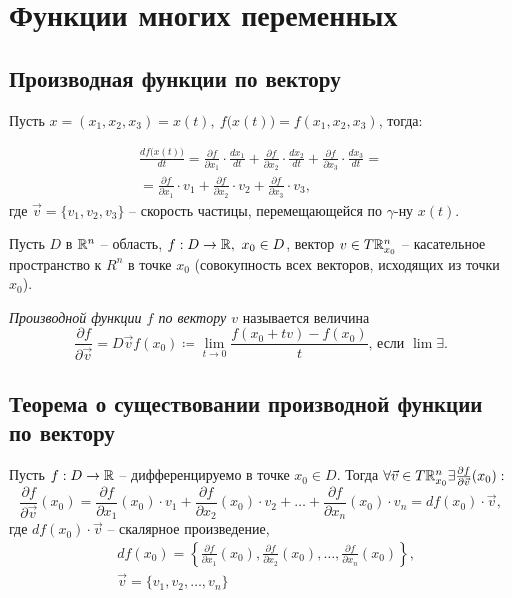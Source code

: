 \section{Функции многих переменных}

\subsection{Производная функции по вектору}

\begin{note}
    Пусть $ x = (x_1,x_2,x_3) = x(t), \ f\big(x(t)\big) = f(x_1,x_2,x_3)$, тогда:

    \begin{multline*}
        \frac{df\big(x(t)\big)}{dt} = \frac{\partial f}{\partial x_1} \cdot \frac{dx_1}{dt} + \frac{\partial f}{\partial x_2} \cdot \frac{dx_2}{dt} + \frac{\partial f}{\partial x_3} \cdot \frac{dx_3}{dt} = \\
        = \frac{\partial f}{\partial x_1} \cdot v_1 + \frac{\partial f}{\partial x_2} \cdot v_2 + \frac{\partial f}{\partial x_3} \cdot v_3,
    \end{multline*}
    где $\vec{v} = \{v_1,v_2,v_3\}$ -- скорость частицы, перемещающейся по $\gamma$-ну $x(t)$.
\end{note}

\begin{definition}
    Пусть $ D $ в $ \mathbb{R}^n $ -- область, $ f:D\rightarrow \mathbb{R}, \ x_0 \in D $, вектор $ v\in T\mathbb{R}_{x_0}^n $ -- касательное пространство к $ R^n $ в точке $ x_0 $ (совокупность всех векторов, исходящих из точки $ x_0 $).

    \emph{Производной функции $ f $ по вектору $ v $} называется величина
    \[
        \frac{\partial f}{\partial \vec{v}} = D \vec{v} f(x_0) \coloneqq \underset{t \rightarrow 0}{\lim}\frac{f(x_0 + tv) - f(x_0)}{t}\text{, если }\lim \exists.
    \]
\end{definition}

\subsection{Теорема о существовании производной функции по вектору}

\begin{statement}
    Пусть $ f:D\rightarrow\mathbb{R} $ -- дифференцируемо в точке $ x_0\in D $. Тогда $ \forall \vec{v}\in T\mathbb{R}_{x_0}^n \exists \frac{\partial f}{\partial \vec{v}}(x_0):$
    \[
        \frac{\partial f}{\partial \vec{v}}(x_0) = \frac{\partial f}{\partial x_1}(x_0) \cdot v_1 + \frac{\partial f}{\partial x_2}(x_0) \cdot v_2 + \ldots +\frac{\partial f}{\partial x_n}(x_0) \cdot v_n = df(x_0)\cdot \vec{v},
    \] где $df(x_0)\cdot \vec{v}$ -- скалярное произведение,
    \begin{align*}
         & df(x_0) = \left\{\frac{\partial f}{\partial x_1}(x_0), \frac{\partial f}{\partial x_2}(x_0), \ldots, \frac{\partial f}{\partial x_n}(x_0)\right\}, \\
         & \vec{v} = \{v_1,v_2,\ldots,v_n\}
    \end{align*}
\end{statement}

